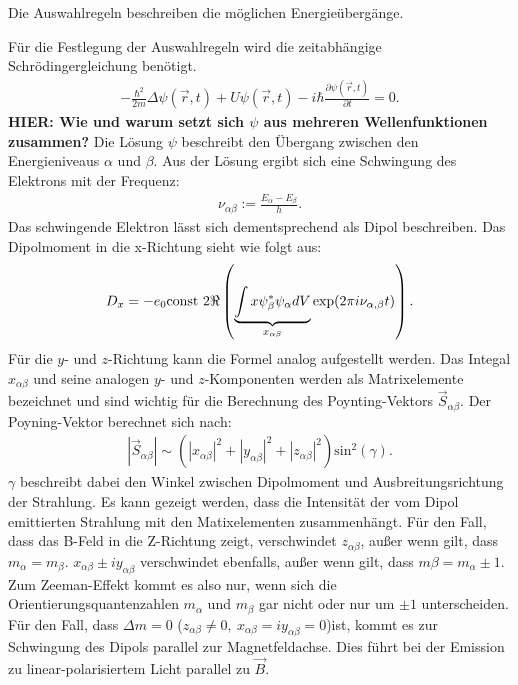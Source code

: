 Die Auswahlregeln beschreiben die möglichen Energieübergänge.

Für die Festlegung der Auswahlregeln wird die zeitabhängige Schrödingergleichung benötigt.
\begin{align}
	-\frac{\hbar^2}{2m}\Delta \psi(\vec{r},t)+U\psi(\vec{r},t)-i\hbar\frac{\partial \psi(\vec{r},t)}{\partial t}=0.
\end{align}
\textbf{\huge{HIER: Wie und warum setzt sich $\psi$ aus mehreren Wellenfunktionen zusammen?}}
Die Lösung $\psi$ beschreibt den Übergang zwischen den Energieniveaus $\alpha$ und $\beta$.
Aus der Lösung ergibt sich eine Schwingung des Elektrons mit der Frequenz:
\begin{align*}
  \nu_{\alpha\beta}:=\frac{E_\alpha-E_\beta}{h}.
\end{align*}
Das schwingende Elektron lässt sich dementsprechend als Dipol beschreiben.
Das Dipolmoment in die x-Richtung sieht wie folgt aus:
\begin{align*}
  	D_x=-e_0\text{const } 2 \Re \real\left( \underbrace{\int x\psi^*_\beta\psi_\alpha dV}_{x_{\alpha\beta}}\exp(2\pi i\nu_{\alpha,\beta}t) \right).
\end{align*}
Für die $y$- und $z$-Richtung kann die Formel analog aufgestellt werden.
Das Integal $x_{\alpha\beta}$ und seine analogen $y$- und $z$-Komponenten werden als Matrixelemente bezeichnet und sind wichtig für die Berechnung des Poynting-Vektors $\vec{S}_{\alpha\beta}$.
Der Poyning-Vektor berechnet sich nach:
\begin{align*}
  |\vec{S}_{\alpha\beta}| \sim \left(|x_{\alpha\beta}|^2+|y_{\alpha\beta}|^2+|z_{\alpha\beta}|^2\right) \text{sin}^2(\gamma).
\end{align*}
$\gamma$ beschreibt dabei den Winkel zwischen Dipolmoment und Ausbreitungsrichtung der Strahlung.
Es kann gezeigt werden, dass die Intensität der vom Dipol emittierten Strahlung mit den Matixelementen zusammenhängt.
Für den Fall, dass das B-Feld in die Z-Richtung zeigt, verschwindet $z_{\alpha\beta}$, außer wenn gilt, dass $m_{\alpha} = m_{\beta}$.
$x_{\alpha\beta}\pm i y_{\alpha\beta}$ verschwindet ebenfalls, außer wenn gilt, dass $m{\beta} = m_{\alpha} \pm 1$.
Zum Zeeman-Effekt kommt es also nur, wenn sich die Orientierungsquantenzahlen $m_{\alpha}$ und $m_{\beta}$ gar nicht oder nur um $\pm 1$ unterscheiden.\\
%
Für den Fall, dass $\Delta m = 0$ ($z_{\alpha\beta} \neq 0,\ x_{\alpha\beta} = i y_{\alpha\beta} = 0$)ist, kommt es zur Schwingung des Dipols parallel zur Magnetfeldachse.
Dies führt bei der Emission zu linear-polarisiertem Licht parallel zu $\vec{B}$.
